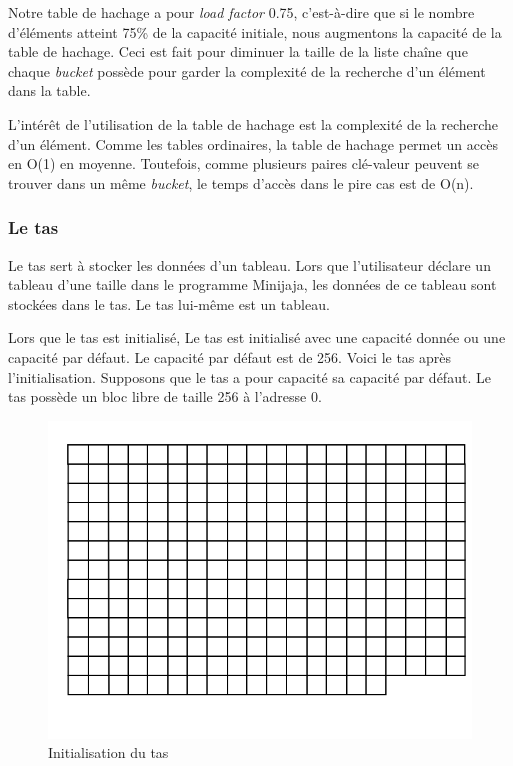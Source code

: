 \documentclass[a4paper,12pt]{report}
\begin{document}
Notre table de hachage a pour \textit{load factor} 0.75, c'est-à-dire que si le nombre d'éléments atteint 75\% de la capacité initiale, nous augmentons la capacité de la table de hachage. Ceci est fait pour diminuer la taille de la liste chaîne que chaque \textit{bucket} possède pour garder la complexité de la recherche d'un élément dans la table.

L'intérêt de l'utilisation de la table de hachage est la complexité de la recherche d'un élément. Comme les tables ordinaires, la table de hachage permet un accès en O(1) en moyenne. Toutefois, comme plusieurs paires clé-valeur peuvent se trouver dans un même \textit{bucket}, le temps d'accès dans le pire cas est de O(n).
 
 
\subsubsection{Le tas}
Le tas sert à stocker les données d'un tableau. Lors que l'utilisateur déclare un tableau d'une taille dans le programme Minijaja, les données de ce tableau sont stockées dans le tas. Le tas lui-même est un tableau.

Lors que le tas est initialisé, Le tas est initialisé avec une capacité donnée ou une capacité par défaut. Le capacité par défaut est de 256. Voici le tas après l'initialisation. Supposons que le tas a pour capacité sa capacité par défaut. Le tas possède un bloc libre de taille 256 à l'adresse 0.

\begin{figure}[H]
\begin{center}
	\includegraphics[scale=0.4]{initializetas}
	\caption{Initialisation du tas}
\end{center}
\end{figure} 
\end{document}
